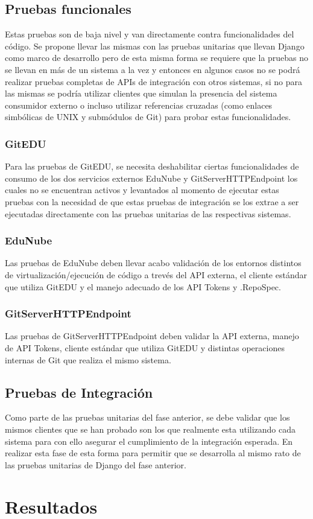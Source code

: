 \subsection{Pruebas funcionales}
Estas pruebas son de baja nivel y van directamente contra funcionalidades del código. Se propone llevar las mismas con las pruebas unitarias que llevan Django como marco de desarrollo pero de esta misma forma se requiere que la pruebas no se llevan en más de un sistema a la vez y entonces en algunos casos no se podrá realizar pruebas completas de APIs de integración con otros sistemas, si no para las mismas se podría utilizar clientes que simulan la presencia del sistema consumidor externo o incluso utilizar referencias cruzadas (como enlaces simbólicas de UNIX y submódulos de Git) para probar estas funcionalidades.

\subsubsection{GitEDU}
Para las pruebas de GitEDU, se necesita deshabilitar ciertas funcionalidades de consumo de los dos servicios externos EduNube y GitServerHTTPEndpoint los cuales no se encuentran activos y levantados al momento de ejecutar estas pruebas con la necesidad de que estas pruebas de integración se los extrae a ser ejecutadas directamente con las pruebas unitarias de las respectivas sistemas.

\subsubsection{EduNube}
Las pruebas de EduNube deben llevar acabo validación de los entornos distintos de virtualización/ejecución de código a trevés del API externa, el cliente estándar que utiliza GitEDU y el manejo adecuado de los API Tokens y .RepoSpec.

\subsubsection{GitServerHTTPEndpoint}
Las pruebas de GitServerHTTPEndpoint deben validar la API externa, manejo de API Tokens, cliente estándar que utiliza GitEDU y distintas operaciones internas de Git que realiza el mismo sistema.

\subsection{Pruebas de Integración}
Como parte de las pruebas unitarias del fase anterior, se debe validar que los mismos clientes que se han probado son los que realmente esta utilizando cada sistema para con ello asegurar el cumplimiento de la integración esperada. En realizar esta fase de esta forma para permitir que se desarrolla al mismo rato de las pruebas unitarias de Django del fase anterior.

\section{Resultados}
